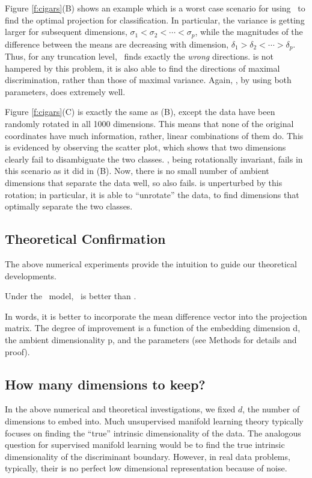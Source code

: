 \documentclass[10pt]{article}
\begin{document}
Figure \ref{f:cigars}(B) shows an example which is a worst case scenario for using \Pca~to find the optimal projection for classification.  
In particular, the variance is getting larger for subsequent dimensions, $\sigma_1 < \sigma_2 < \cdots < \sigma_p$, while the magnitudes of the difference between the means are decreasing with dimension, $\delta_1 > \delta_2 < \cdots > \delta_p$. 
Thus, for any truncation level,  \Pca~finds exactly the \emph{wrong} directions.  
 is not hampered by this problem, it is also able to find the directions of maximal discrimination, rather than those of maximal variance.
Again, \Lol, by using both parameters, does extremely well.


Figure \ref{f:cigars}(C) is exactly the same as (B), except the data have been randomly rotated in all 1000 dimensions.  This means that none of the original coordinates have much information, rather, linear combinations of them do.  
This is evidenced by observing the scatter plot, which shows that two dimensions clearly fail to disambiguate the two classes.
\Pca, being rotationally invariant, fails in this scenario as it did in (B).
Now, there is no small number of ambient dimensions that separate the data well, so  also fails.
 \Lol is unperturbed by this rotation; in particular, it is able to ``unrotate'' the data, to find dimensions that optimally separate the two classes.  


\subsection*{Theoretical Confirmation}

The above numerical experiments provide the intuition to guide our theoretical developments.  
\begin{thm} \label{t:LDA}
Under the \Lda~model, \Lol~is better than \Pca.
\end{thm}
In words, it is better to incorporate the mean difference vector into the projection matrix.  The degree of improvement is a function of the embedding dimension d, the ambient dimensionality p, and the parameters (see Methods for details and proof).



\subsection*{How many dimensions to keep?}

In the above numerical and theoretical investigations, we fixed $d$, the number of dimensions to embed into.  Much unsupervised manifold learning theory typically focuses on finding the ``true'' intrinsic dimensionality of the data.   The analogous question for supervised manifold learning would be to find the true intrinsic dimensionality of the discriminant boundary.  However, in real data problems, typically, their is no perfect low dimensional representation because of noise.
\end{document}
